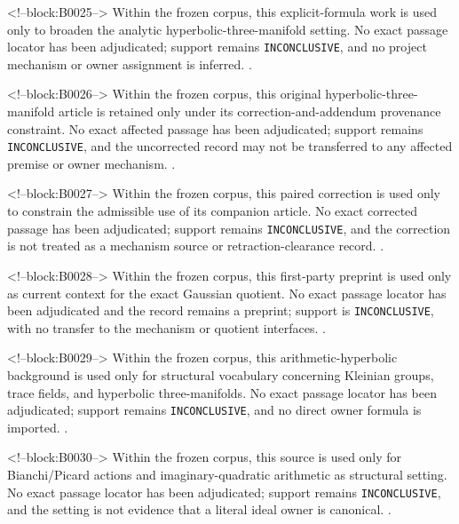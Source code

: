 \documentclass[11pt,a4paper]{article}
\begin{document}
<!--block:B0025-->
Within the frozen corpus, this explicit-formula work is used only to broaden the analytic hyperbolic-three-manifold setting. No exact passage locator has been adjudicated; support remains \texttt{INCONCLUSIVE}, and no project mechanism or owner assignment is inferred.
\citep{P29-S05}.

<!--block:B0026-->
Within the frozen corpus, this original hyperbolic-three-manifold article is retained only under its correction-and-addendum provenance constraint. No exact affected passage has been adjudicated; support remains \texttt{INCONCLUSIVE}, and the uncorrected record may not be transferred to any affected premise or owner mechanism.
\citep{P29-S06}.

<!--block:B0027-->
Within the frozen corpus, this paired correction is used only to constrain the admissible use of its companion article. No exact corrected passage has been adjudicated; support remains \texttt{INCONCLUSIVE}, and the correction is not treated as a mechanism source or retraction-clearance record.
\citep{P29-S07}.

<!--block:B0028-->
Within the frozen corpus, this first-party preprint is used only as current context for the exact Gaussian quotient. No exact passage locator has been adjudicated and the record remains a preprint; support is \texttt{INCONCLUSIVE}, with no transfer to the mechanism or quotient interfaces.
\citep{P29-S09}.

<!--block:B0029-->
Within the frozen corpus, this arithmetic-hyperbolic background is used only for structural vocabulary concerning Kleinian groups, trace fields, and hyperbolic three-manifolds. No exact passage locator has been adjudicated; support remains \texttt{INCONCLUSIVE}, and no direct owner formula is imported.
\citep{P29-S17}.

<!--block:B0030-->
Within the frozen corpus, this source is used only for Bianchi/Picard actions and imaginary-quadratic arithmetic as structural setting. No exact passage locator has been adjudicated; support remains \texttt{INCONCLUSIVE}, and the setting is not evidence that a literal ideal owner is canonical.
\citep{P29-S18}.
\end{document}
